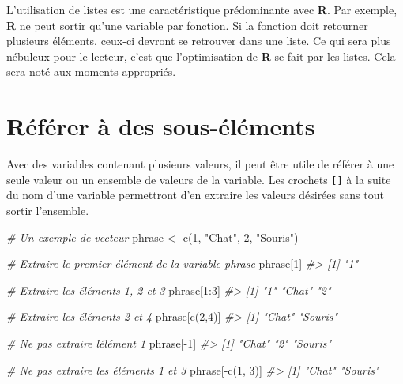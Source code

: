 \documentclass[
]{book}
\newenvironment{Shaded}{}{}
\newcommand{\CommentTok}[1]{\textit{#1}}
\newcommand{\DecValTok}[1]{#1}
\newcommand{\FunctionTok}[1]{#1}
\newcommand{\NormalTok}[1]{#1}
\newcommand{\OtherTok}[1]{#1}
\newcommand{\SpecialCharTok}[1]{#1}
\newcommand{\StringTok}[1]{#1}
\begin{document}
L'utilisation de listes est une caractéristique prédominante avec \textbf{R}. Par exemple, \textbf{R} ne peut sortir qu'une variable par fonction. Si la fonction doit retourner plusieurs éléments, ceux-ci devront se retrouver dans une liste. Ce qui sera plus nébuleux pour le lecteur, c'est que l'optimisation de \textbf{R} se fait par les listes. Cela sera noté aux moments appropriés.

\hypertarget{ruxe9fuxe9rer-uxe0-des-sous-uxe9luxe9ments}{%
\section{Référer à des sous-éléments}\label{ruxe9fuxe9rer-uxe0-des-sous-uxe9luxe9ments}}

Avec des variables contenant plusieurs valeurs, il peut être utile de référer à une seule valeur ou un ensemble de valeurs de la variable. Les crochets \texttt{{[}{]}} à la suite du nom d'une variable permettront d'en extraire les valeurs désirées sans tout sortir l'ensemble.

\begin{Shaded}
\begin{Highlighting}[]
\CommentTok{\# Un exemple de vecteur}
\NormalTok{phrase }\OtherTok{\textless{}{-}} \FunctionTok{c}\NormalTok{(}\DecValTok{1}\NormalTok{, }\StringTok{"Chat"}\NormalTok{, }\DecValTok{2}\NormalTok{, }\StringTok{"Souris"}\NormalTok{)}

\CommentTok{\# Extraire le premier élément de la variable phrase}
\NormalTok{phrase[}\DecValTok{1}\NormalTok{]}
\CommentTok{\#\textgreater{} [1] "1"}

\CommentTok{\# Extraire les éléments 1, 2 et 3}
\NormalTok{phrase[}\DecValTok{1}\SpecialCharTok{:}\DecValTok{3}\NormalTok{]}
\CommentTok{\#\textgreater{} [1] "1"    "Chat" "2"}

\CommentTok{\# Extraire les éléments 2 et 4}
\NormalTok{phrase[}\FunctionTok{c}\NormalTok{(}\DecValTok{2}\NormalTok{,}\DecValTok{4}\NormalTok{)]}
\CommentTok{\#\textgreater{} [1] "Chat"   "Souris"}

\CommentTok{\# Ne pas extraire l\textquotesingle{}élément 1}
\NormalTok{phrase[}\SpecialCharTok{{-}}\DecValTok{1}\NormalTok{]}
\CommentTok{\#\textgreater{} [1] "Chat"   "2"      "Souris"}

\CommentTok{\# Ne pas extraire les éléments 1 et 3}
\NormalTok{phrase[}\SpecialCharTok{{-}}\FunctionTok{c}\NormalTok{(}\DecValTok{1}\NormalTok{, }\DecValTok{3}\NormalTok{)]}
\CommentTok{\#\textgreater{} [1] "Chat"   "Souris"}
\end{Highlighting}
\end{Shaded}
\end{document}
